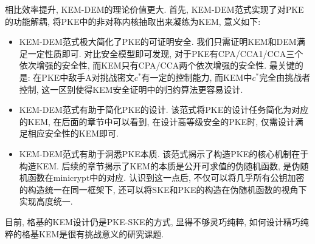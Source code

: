 相比效率提升, KEM-DEM的理论价值更大. 首先, KEM-DEM范式实现了对PKE的功能解耦, 将PKE中的非对称内核抽取出来凝练为KEM, 意义如下:
\begin{itemize}
\item KEM-DEM范式极大简化了PKE的可证明安全. 我们只需证明KEM和DEM满足一定性质即可. 
	对比安全模型即可发现, 对于PKE有CPA/CCA1/CCA三个依次增强的安全性, 而KEM只有CPA/CCA两个依次增强的安全性. 
	最关键的是: 在PKE中敌手A对挑战密文$c^*$有一定的控制能力, 而KEM中$c^*$完全由挑战者控制, 
	这一区别使得KEM安全证明中的归约算法更容易设计.

\item KEM-DEM范式有助于简化PKE的设计. 该范式将PKE的设计任务简化为对应的KEM, 
	在后面的章节中可以看到, 在设计高等级安全的PKE时, 仅需设计满足相应安全性的KEM即可.

\item KEM-DEM范式有助于洞悉PKE本质. 该范式揭示了构造PKE的核心机制在于构造KEM. 
	后续的章节揭示了KEM的本质是公开可求值的伪随机函数, 是伪随机函数在minicrypt中的对应. 
	认识到这一点后, 不仅可以将几乎所有公钥加密的构造统一在同一框架下, 还可以将SKE和PKE的构造在伪随机函数的视角下实现高度统一. 
\end{itemize}

\begin{remark}
目前, 格基的KEM设计仍是PKE-SKE的方式, 显得不够灵巧纯粹, 如何设计精巧纯粹的格基KEM是很有挑战意义的研究课题. 
\end{remark}